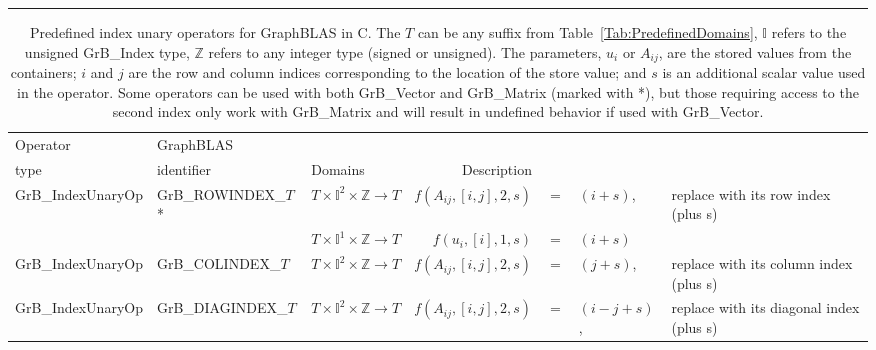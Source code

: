 \begin{landscape}
\begin{table}[h]
\hspace{-1.5em}\begin{threeparttable}
\hrule
\vspace{1\baselineskip}
\caption{Predefined index unary operators for GraphBLAS in C.  The $T$ can 
be any suffix from Table~\ref{Tab:PredefinedDomains}, $\mathbb{I}$ refers to the unsigned 
{\sf GrB\_Index} type, $\mathbb{Z}$ refers to any integer type (signed or unsigned).  
The parameters, $u_i$ or $A_{ij}$, are the stored values from the containers; $i$ 
and $j$ are the row and column indices corresponding to the location of the store value;
and $s$ is an additional scalar value used in the operator. Some operators can be used with both
{\sf GrB\_Vector} and {\sf GrB\_Matrix} (marked with *), but those requiring access to the second index
only work with {\sf GrB\_Matrix} and will result in undefined behavior if used with
{\sf GrB\_Vector}. }
\label{Tab:PredefIndexOperators}
\vspace{1\baselineskip}

\begin{tabular}{l|l|l|rcll}
Operator & GraphBLAS             &                                                      & \\
type     & identifier            & Domains                                              & Description \\ \hline
{\sf GrB\_IndexUnaryOp}   & {\sf GrB\_ROWINDEX\_$T$}*  & $T \times \mathbb{I}^2 \times \mathbb{Z} \rightarrow T$ & $f(A_{ij},[i,j],2,s)$ & $=$ & $(i + s)$, & replace with its row index (plus s) \\
                          &                            & $T \times \mathbb{I}^1 \times \mathbb{Z} \rightarrow T$ & $f(u_{i},[i],1,s)$ & $=$ & $(i + s)$ \\
{\sf GrB\_IndexUnaryOp}   & {\sf GrB\_COLINDEX\_$T$}   & $T \times \mathbb{I}^2 \times \mathbb{Z} \rightarrow T$ & $f(A_{ij},[i,j],2,s)$ & $=$ & $(j + s)$, & replace with its column index (plus s) \\
{\sf GrB\_IndexUnaryOp}   & {\sf GrB\_DIAGINDEX\_$T$}  & $T \times \mathbb{I}^2 \times \mathbb{Z} \rightarrow T$ & $f(A_{ij},[i,j],2,s)$ & $=$ & $(i - j + s)$, & replace with its diagonal index (plus s) \\
\hline


\end{tabular}
\end{threeparttable}
\end{table}
\end{landscape}
